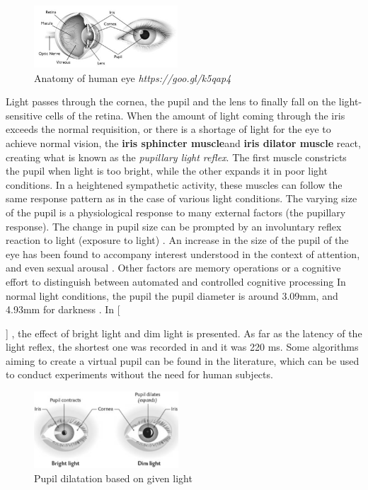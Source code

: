 \documentclass[USenglish,twocolumn]{article}
\newcommand{\Ref}[2]{%
    \IfEqCase{#1}{%
	    {fig}{Figure~\ref{#2}}%
	    {tab}{Table~\ref{#2}}%
	    {equ}{Equation~\ref{#2}}%
    }[\PackageError{tree}{Undefined option to tree: #1}{}]%
}%
\begin{document}
\begin{figure}[ht!]
	\centering
	\includegraphics[width=0.48\textwidth]{img/anatomy.png}
	\caption{Anatomy of human eye \textit{https://goo.gl/k5qap4}}
	\label{fig:anatomy}
\end{figure}
\indent Light passes through the cornea, the pupil and the lens to finally fall on the light-sensitive cells of the retina. When the amount of light coming through the iris exceeds the normal requisition, or there is a shortage of light for the eye to achieve normal vision, the \textbf{iris sphincter muscle}and \textbf{iris dilator muscle} react, creating what is known as the \textit{pupillary light reflex}. The first muscle constricts the pupil when light is too bright, while the other expands it in poor light conditions. In a heightened sympathetic activity, these muscles can follow the same response pattern as in the case of various light conditions. The varying size of the pupil is a physiological response to many external factors (the pupillary response). The change in pupil size can be prompted by an involuntary reflex reaction to light (exposure to light) \cite{Saladin}. An increase in the size of the pupil of the eye has been found to accompany interest understood in the context of attention, and even sexual arousal \cite{Hess} \cite{Hammerer}. Other factors are memory operations \cite{Bradley} or a cognitive effort to distinguish between automated and controlled cognitive processing \cite{Querino} \cite{Staniucha} In normal light conditions, the pupil the pupil diameter is around 3.09mm, and 4.93mm for darkness \cite{Wyatt}. In \Ref{fig}{fig:dilatation}, the effect of bright light and dim light is presented. As far as the latency of the light reflex, the shortest one was recorded in \cite{Ellis} and it was 220 ms. Some algorithms aiming to create a virtual pupil \cite{Walraven} can be found in the literature, which can be used to conduct experiments without the need for human subjects.
\begin{figure}[H]
	\centering
	\includegraphics[width=0.48\textwidth]{img/dilatation.png}
	\caption{Pupil dilatation based on given light \cite{Walker}}
	\label{fig:dilatation}
\end{figure}
\end{document}
